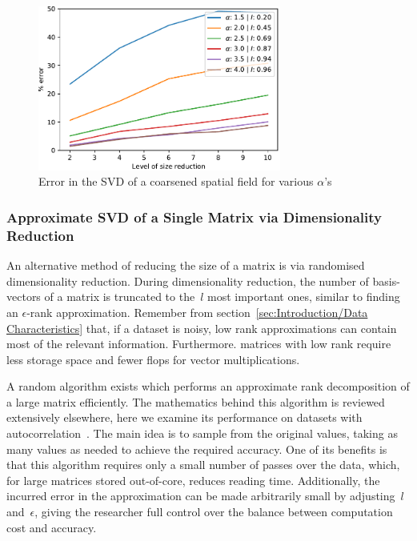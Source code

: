 \documentclass[ijgi,article,submit,moreauthors,pdftex,10pt,a4paper]{Definitions/mdpi}
\begin{document}
\begin{figure}[H]
\centering
\includegraphics[width=80mm]{Results/plotSingleSpatialFieldViaCoarsening.pdf}
\caption[Error after coarsening]{Error in the SVD of a coarsened spatial field for various $\alpha$'s}
\label{fig:plotSingleSpatialFieldViaCoarsening}
\end{figure}

\subsubsection{Approximate SVD of a Single Matrix via Dimensionality Reduction}
\label{sec:Results/Approximate SVD of a Single Matrix via Dimensionality Reduction}

An alternative method of reducing the size of a matrix is via randomised dimensionality reduction. During dimensionality reduction, the number of basis-vectors of a matrix is truncated to the~$l$ most important ones, similar to finding an $\epsilon$-rank approximation. Remember from section~\ref{sec:Introduction/Data Characteristics} that, if a dataset is noisy, low rank approximations can contain most of the relevant information. Furthermore. matrices with low rank require less storage space and fewer flops for vector multiplications.

A random algorithm exists which performs an approximate rank decomposition of a large matrix efficiently. The mathematics behind this algorithm is reviewed extensively elsewhere, here we examine its performance on datasets with autocorrelation~\cite{Halko2011, Li2016}. The main idea is to sample from the original values, taking as many values as needed to achieve the required accuracy. One of its benefits is that this algorithm requires only a small number of passes over the data, which, for large matrices stored out-of-core, reduces reading time. Additionally, the incurred error in the approximation can be made arbitrarily small by adjusting~$l$ and~$\epsilon$, giving the researcher full control over the balance between computation cost and accuracy.
\end{document}
